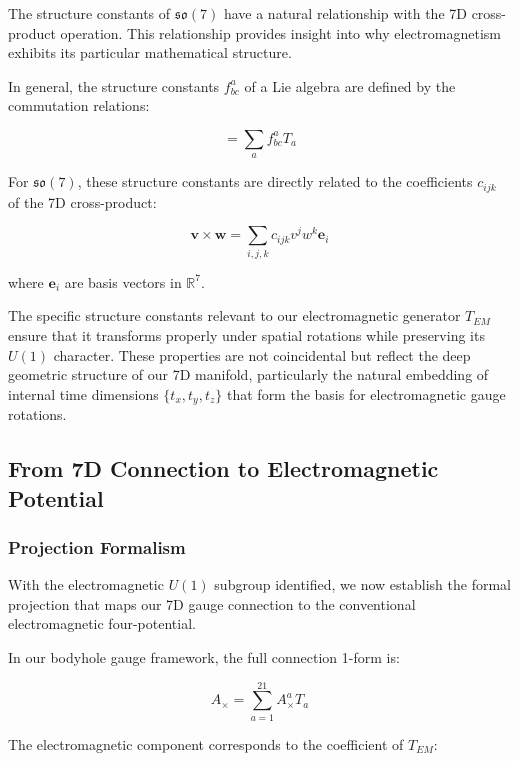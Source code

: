 \documentclass{article}
\begin{document}
The structure constants of $\mathfrak{so}(7)$ have a natural relationship with the 7D cross-product operation. This relationship provides insight into why electromagnetism exhibits its particular mathematical structure.

In general, the structure constants $f^a_{bc}$ of a Lie algebra are defined by the commutation relations:

\begin{equation}
[T_b, T_c] = \sum_a f^a_{bc} T_a
\end{equation}

For $\mathfrak{so}(7)$, these structure constants are directly related to the coefficients $c_{ijk}$ of the 7D cross-product:

\begin{equation}
\mathbf{v} \times \mathbf{w} = \sum_{i,j,k} c_{ijk} v^j w^k \mathbf{e}_i
\end{equation}

where $\mathbf{e}_i$ are basis vectors in $\mathbb{R}^7$.

The specific structure constants relevant to our electromagnetic generator $T_{EM}$ ensure that it transforms properly under spatial rotations while preserving its $U(1)$ character. These properties are not coincidental but reflect the deep geometric structure of our 7D manifold, particularly the natural embedding of internal time dimensions $\{t_x, t_y, t_z\}$ that form the basis for electromagnetic gauge rotations.

\subsection{From 7D Connection to Electromagnetic Potential}

\subsubsection{Projection Formalism}

With the electromagnetic $U(1)$ subgroup identified, we now establish the formal projection that maps our 7D gauge connection to the conventional electromagnetic four-potential.

In our bodyhole gauge framework, the full connection 1-form is:

\begin{equation}
A_{\times} = \sum_{a=1}^{21} A^a_{\times} T_a
\end{equation}

The electromagnetic component corresponds to the coefficient of $T_{EM}$:
\end{document}
